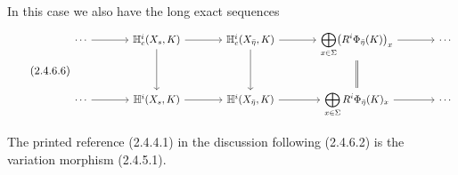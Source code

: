 In this case we also have the long exact sequences
\begin{equation}\tag{2.4.6.6}
\resizebox{\textwidth}{!}{%
\begin{tikzcd}[ampersand replacement=\&, column sep=large, row sep=large]
\cdots \arrow[r]
  \& \mathbb H^i_c(X_s,K) \arrow[r] \arrow[d]
  \& \mathbb H^i_c(X_{\bar\eta},K) \arrow[r] \arrow[d]
  \& \displaystyle\bigoplus_{x\in\Sigma}
     \bigl(R^i\Phi_{\bar\eta}(K)\bigr)_x
     \arrow[r] \arrow[d, equal]
  \& \cdots \\
\cdots \arrow[r]
  \& \mathbb H^i(X_s,K) \arrow[r]
  \& \mathbb H^i(X_{\bar\eta},K) \arrow[r]
  \& \displaystyle\bigoplus_{x\in\Sigma}
     R^i\Phi_{\bar\eta}(K)_x \arrow[r]
  \& \cdots
\end{tikzcd}}
\end{equation}

The printed reference (2.4.4.1) in the discussion following
(2.4.6.2) is the variation morphism (2.4.5.1).
